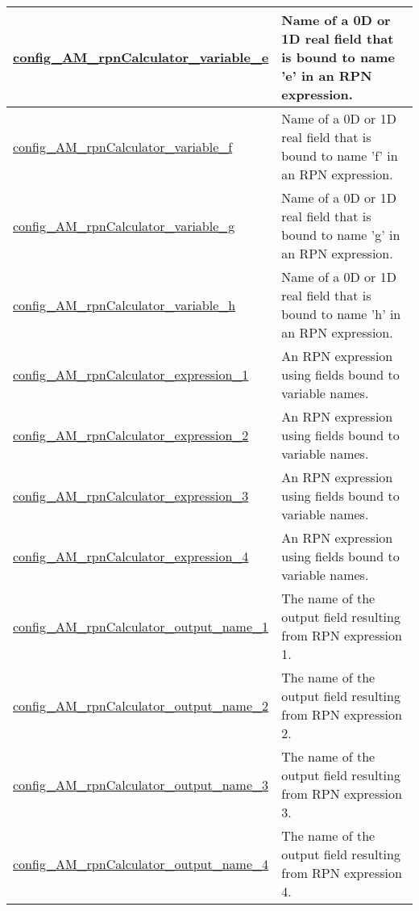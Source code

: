 {\begin{center}
\begin{longtable}{| p{2.0in} || p{4.0in} |}
    \hline
    \hyperref[subsec:nm_sec_config_AM_rpnCalculator_variable_e]{config\_AM\_rpnCalculator\_\-variable\_e} & Name of a 0D or 1D real field that is bound to name 'e' in an RPN expression. \\
    \hline
    \hyperref[subsec:nm_sec_config_AM_rpnCalculator_variable_f]{config\_AM\_rpnCalculator\_\-variable\_f} & Name of a 0D or 1D real field that is bound to name 'f' in an RPN expression. \\
    \hline
    \hyperref[subsec:nm_sec_config_AM_rpnCalculator_variable_g]{config\_AM\_rpnCalculator\_\-variable\_g} & Name of a 0D or 1D real field that is bound to name 'g' in an RPN expression. \\
    \hline
    \hyperref[subsec:nm_sec_config_AM_rpnCalculator_variable_h]{config\_AM\_rpnCalculator\_\-variable\_h} & Name of a 0D or 1D real field that is bound to name 'h' in an RPN expression. \\
    \hline
    \hyperref[subsec:nm_sec_config_AM_rpnCalculator_expression_1]{config\_AM\_rpnCalculator\_\-expression\_1} & An RPN expression using fields bound to variable names. \\
    \hline
    \hyperref[subsec:nm_sec_config_AM_rpnCalculator_expression_2]{config\_AM\_rpnCalculator\_\-expression\_2} & An RPN expression using fields bound to variable names. \\
    \hline
    \hyperref[subsec:nm_sec_config_AM_rpnCalculator_expression_3]{config\_AM\_rpnCalculator\_\-expression\_3} & An RPN expression using fields bound to variable names. \\
    \hline
    \hyperref[subsec:nm_sec_config_AM_rpnCalculator_expression_4]{config\_AM\_rpnCalculator\_\-expression\_4} & An RPN expression using fields bound to variable names. \\
    \hline
    \hyperref[subsec:nm_sec_config_AM_rpnCalculator_output_name_1]{config\_AM\_rpnCalculator\_\-output\_name\_1} & The name of the output field resulting from RPN expression 1. \\
    \hline
    \hyperref[subsec:nm_sec_config_AM_rpnCalculator_output_name_2]{config\_AM\_rpnCalculator\_\-output\_name\_2} & The name of the output field resulting from RPN expression 2. \\
    \hline
    \hyperref[subsec:nm_sec_config_AM_rpnCalculator_output_name_3]{config\_AM\_rpnCalculator\_\-output\_name\_3} & The name of the output field resulting from RPN expression 3. \\
    \hline
    \hyperref[subsec:nm_sec_config_AM_rpnCalculator_output_name_4]{config\_AM\_rpnCalculator\_\-output\_name\_4} & The name of the output field resulting from RPN expression 4. \\
    \hline
\end{longtable}
\end{center}
}
